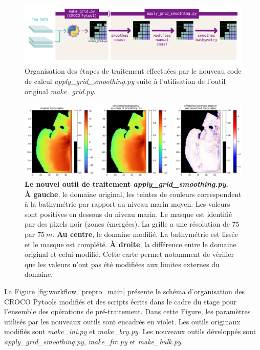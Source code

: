 \documentclass[10pt,a4paper,titlepage]{article}
\begin{document}
\begin{figure}[H]
    \centering
    \includegraphics[scale=0.7]{../images/workflow/grid_smoothing.pdf}
    \caption{Organisation des étapes de traitement effectuées par le nouveau code de calcul \textit{apply\_grid\_smoothing.py} suite à l'utilisation de l'outil original \textit{make\_grid.py}.}
    \label{fig:new_smooth_work}

\end{figure}
\begin{figure}[H]
    \centering
    \includegraphics[scale=0.35]{../images/grid_smoothing_adcl5_9.png}
    \caption{
        \textbf{Le nouvel outil de traitement \textit{apply\_grid\_smoothing.py}.}\\
        \textbf{À gauche}, le domaine original, les teintes de couleurs correspondent à la bathymétrie par rapport au niveau marin moyen.
        Les valeurs sont positives en dessous du niveau marin.
        Le masque est identifié par des pixels noir (zones émergées).
        La grille a une résolution de $75$ par $75~m$.
        \textbf{Au centre}, le domaine modifié.
        La bathymétrie est lissée et le masque est complété.
        \textbf{À droite}, la différence entre le domaine original et celui modifié.
        Cette carte permet notamment de vérifier que les valeurs n'ont pas été modifiées aux limites externes du domaine.
    }
    \label{fig:new_smooth}
\end{figure}

La Figure \ref{fig:workflow_prepro_main} présente le schéma d'organisation des CROCO Pytools modifiés et des scripts écrits dans le cadre du stage pour l'ensemble des opérations de pré-traitement.
Dans cette Figure, les paramètres utilisés par les nouveaux outils sont encadrés en violet.
Les outils originaux modifiés sont \textit{make\_ini.py} et \textit{make\_bry.py}.
Les nouveaux outils développés sont \textit{apply\_grid\_smoothing.py}, \textit{make\_frc.py} et \textit{make\_bulk.py}.
\end{document}
